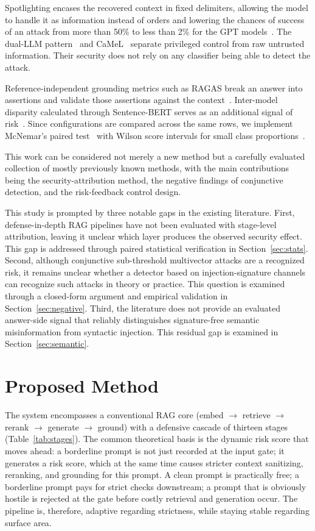 \documentclass[conference]{IEEEtran}
\begin{document}
Spotlighting encases the recovered context in fixed delimiters, allowing the model to handle it as information instead of orders and lowering the chances of success of an attack from more than 50\% to less than 2\% for the GPT models~\cite{hines2024spotlighting}. The dual-LLM pattern~\cite{willison2023dual} and CaMeL~\cite{debenedetti2025camel} separate privileged control from raw untrusted information. Their security does not rely on any classifier being able to detect the attack.

Reference-independent grounding metrics such as RAGAS break an answer into assertions and validate those assertions against the context~\cite{es2023ragas}. Inter-model disparity calculated through Sentence-BERT serves as an additional signal of risk~\cite{reimers2019sbert}. Since configurations are compared across the same rows, we implement McNemar's paired test~\cite{mcnemar1947} with Wilson score intervals for small class proportions~\cite{wilson1927}.

This work can be considered not merely a new method but a carefully evaluated collection of mostly previously known methods, with the main contributions being the security-attribution method, the negative findings of conjunctive detection, and the risk-feedback control design.

This study is prompted by three notable gaps in the existing literature. First, defense-in-depth RAG pipelines have not been evaluated with stage-level attribution, leaving it unclear which layer produces the observed security effect. This gap is addressed through paired statistical verification in Section~\ref{sec:stats}. Second, although conjunctive sub-threshold multivector attacks are a recognized risk, it remains unclear whether a detector based on injection-signature channels can recognize such attacks in theory or practice. This question is examined through a closed-form argument and empirical validation in Section~\ref{sec:negative}. Third, the literature does not provide an evaluated answer-side signal that reliably distinguishes signature-free semantic misinformation from syntactic injection. This residual gap is examined in Section~\ref{sec:semantic}.

\section{Proposed Method}\label{sec:method}
The system encompasses a conventional RAG core (embed $\rightarrow$ retrieve $\rightarrow$ rerank $\rightarrow$ generate $\rightarrow$ ground) with a defensive cascade of thirteen stages (Table~\ref{tab:stages}). The common theoretical basis is the dynamic risk score that moves ahead: a borderline prompt is not just recorded at the input gate; it generates a risk score, which at the same time causes stricter context sanitizing, reranking, and grounding for this prompt. A clean prompt is practically free; a borderline prompt pays for strict checks downstream; a prompt that is obviously hostile is rejected at the gate before costly retrieval and generation occur. The pipeline is, therefore, adaptive regarding strictness, while staying stable regarding surface area.
\end{document}
